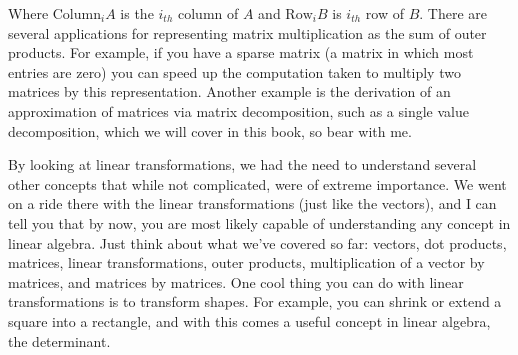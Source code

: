 \documentclass[a4,12pt,twosided,openany]{memoir}
\begin{document}
\par 
\indent
Where $\textrm{Column}_i A$ is the $i_{th}$ column of $A$ and $\textrm{Row}_i B$ is $i_{th}$ row of $B$. There are several applications for representing matrix multiplication as the sum of outer products. For example, if you have a sparse matrix (a matrix in which most entries are zero) you can speed up the computation taken to multiply two matrices by this representation. Another example is the derivation of an approximation of matrices via matrix decomposition, such as a single value decomposition, which we will cover in this book, so bear with me.
\par 
\indent
By looking at linear transformations, we had the need to understand several other concepts that while not complicated, were of extreme importance. We went on  a ride there with the linear transformations (just like the vectors), and I can tell you that by now, you are most likely capable of understanding any concept in linear algebra. Just think about what we’ve covered so far: vectors, dot products, matrices, linear transformations, outer products, multiplication of a vector by matrices, and matrices by matrices. One cool thing you can do with linear transformations is to transform shapes. For example, you can shrink or extend a square into a rectangle, and with this comes a useful concept in linear algebra, the determinant.
\end{document}
